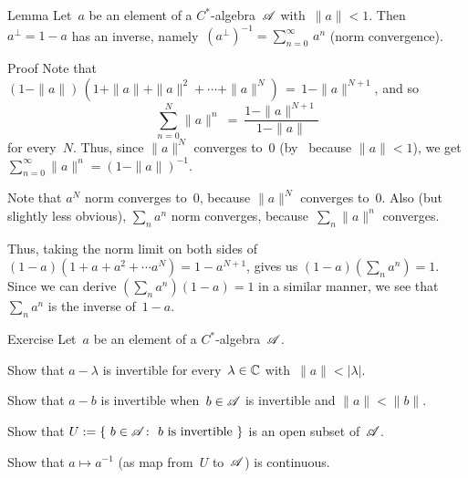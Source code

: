 \documentclass[main]{subfiles}
\begin{document}
%
%
\begin{parsec}[geometric]%
\begin{point}{Lemma}%
Let~$a$ be an element of a $C^*$-algebra~$\mathscr{A}$ with~$\|a\|<1$.
Then~$a^\perp=1-a$ has an inverse,
namely~$(a^\perp)^{-1}= \sum_{n=0}^\infty\, a^n$
(norm convergence).
\end{point}
\begin{point}{Proof}%
Note that
$(1-\|a\|)\,(1+\|a\|+\|a\|^2+\dotsb+\|a\|^N) \,=\, 1-\|a\|^{N+1}$,
and so 
\begin{equation*}
\sum_{n=0}^N \|a\|^n \ =\  \frac{1-\|a\|^{N+1}}{1-\|a\|}
\end{equation*}
for every~$N$.
Thus,
since $\|a\|^N$ converges to~$0$
(by~\TODO{} because $\|a\|<1$),
we  get $\sum_{n=0}^\infty \|a\|^n = (1-\|a\|)^{-1}$.

\begin{point}%
Note that $a^N$ norm converges to~$0$,
because $\|a\|^N$ converges to~$0$.
Also (but slightly less obvious),
$\sum_n a^n$ norm converges,
because~$\sum_n \|a\|^n$ converges.
\end{point}
\begin{point}%
Thus, taking the norm limit
on both sides of $(1-a)(1+a+a^2+\dotsb a^N) = 1-a^{N+1}$,
gives us $(1-a)(\sum_n a^n) = 1$.
Since we can derive $(\sum_n a^n)(1-a) = 1$
in a similar manner, 
we see that $\sum_n a^n$ is the inverse of~$1-a$.
\end{point}
\end{point}
\begin{point}{Exercise}
Let~$a$ be an element of a $C^*$-algebra~$\mathscr{A}$.
\begin{point}%
Show that $a-\lambda$ is invertible
for every~$\lambda\in\mathbb{C}$ with~$\|a\|< \left|\lambda\right|$.
\end{point}
\begin{point}%
Show that $a-b$ is invertible
when~$b\in\mathscr{A}$ is invertible and $\|a\| < \|b\|$.
\end{point}
\begin{point}%
Show that $U:=\{\ b\in\scrA\colon\ \text{$b$ is invertible}\ \}$
is an open subset of~$\mathscr{A}$.
\end{point}
\begin{point}%
Show that $a\mapsto a^{-1}$ (as map from~$U$ to~$\mathscr{A}$)
is continuous.

\end{point}
\end{point}
\end{parsec}
\end{document}
